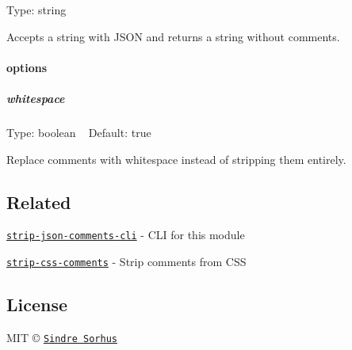 Type\+: {\ttfamily string}

Accepts a string with J\+S\+ON and returns a string without comments.

\paragraph*{options}

\subparagraph*{whitespace}

Type\+: {\ttfamily boolean} ~\newline
Default\+: {\ttfamily true}

Replace comments with whitespace instead of stripping them entirely.

\subsection*{Related}


\begin{DoxyItemize}
\item \href{https://github.com/sindresorhus/strip-json-comments-cli}{\tt strip-\/json-\/comments-\/cli} -\/ C\+LI for this module
\item \href{https://github.com/sindresorhus/strip-css-comments}{\tt strip-\/css-\/comments} -\/ Strip comments from C\+SS
\end{DoxyItemize}

\subsection*{License}

M\+IT © \href{http://sindresorhus.com}{\tt Sindre Sorhus} 